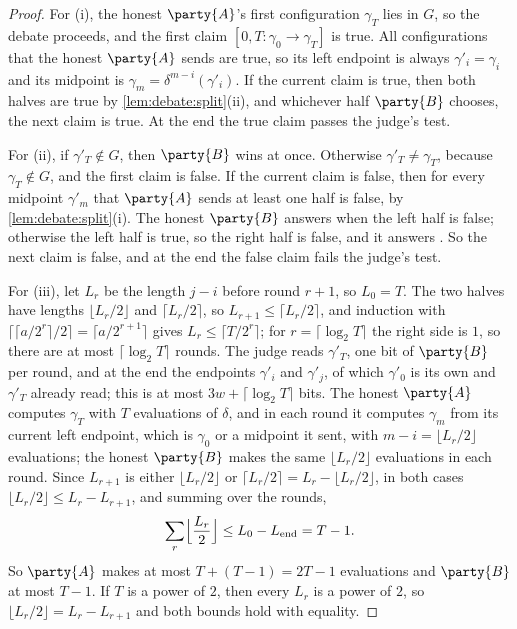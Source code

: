 \begin{refsection}
\begin{proof}
For (i), the honest $\party{A}$'s first configuration $\gamma_T$ lies in $G$, so the debate proceeds, and the first claim $[0,T:\gamma_0\to\gamma_T]$ is true. All configurations that the honest $\party{A}$ sends are true, so its left endpoint is always $\gamma'_i=\gamma_i$ and its midpoint is $\gamma_m=\delta^{m-i}(\gamma'_i)$. If the current claim is true, then both halves are true by \cref{lem:debate:split}(ii), and whichever half $\party{B}$ chooses, the next claim is true. At the end the true claim passes the judge's test.

For (ii), if $\gamma'_T\notin G$, then $\party{B}$ wins at once. Otherwise $\gamma'_T\ne\gamma_T$, because $\gamma_T\notin G$, and the first claim is false. If the current claim is false, then for every midpoint $\gamma'_m$ that $\party{A}$ sends at least one half is false, by \cref{lem:debate:split}(i). The honest $\party{B}$ answers \debateL{} when the left half is false; otherwise the left half is true, so the right half is false, and it answers \debateR. So the next claim is false, and at the end the false claim fails the judge's test.

For (iii), let $L_r$ be the length $j-i$ before round $r+1$, so $L_0=T$. The two halves have lengths $\lfloor L_r/2\rfloor$ and $\lceil L_r/2\rceil$, so $L_{r+1}\le\lceil L_r/2\rceil$, and induction with $\lceil\lceil a/2^r\rceil/2\rceil=\lceil a/2^{r+1}\rceil$ gives $L_r\le\lceil T/2^r\rceil$; for $r=\lceil\log_2T\rceil$ the right side is $1$, so there are at most $\lceil\log_2T\rceil$ rounds. The judge reads $\gamma'_T$, one bit of $\party{B}$ per round, and at the end the endpoints $\gamma'_i$ and $\gamma'_j$, of which $\gamma'_0$ is its own and $\gamma'_T$ already read; this is at most $3w+\lceil\log_2T\rceil$ bits. The honest $\party{A}$ computes $\gamma_T$ with $T$ evaluations of $\delta$, and in each round it computes $\gamma_m$ from its current left endpoint, which is $\gamma_0$ or a midpoint it sent, with $m-i=\lfloor L_r/2\rfloor$ evaluations; the honest $\party{B}$ makes the same $\lfloor L_r/2\rfloor$ evaluations in each round. Since $L_{r+1}$ is either $\lfloor L_r/2\rfloor$ or $\lceil L_r/2\rceil=L_r-\lfloor L_r/2\rfloor$, in both cases $\lfloor L_r/2\rfloor\le L_r-L_{r+1}$, and summing over the rounds,
\[\sum_r\Bigl\lfloor\frac{L_r}2\Bigr\rfloor\le L_0-L_{\mathrm{end}}=T-1.\]
So $\party{A}$ makes at most $T+(T-1)=2T-1$ evaluations and $\party{B}$ at most $T-1$. If $T$ is a power of $2$, then every $L_r$ is a power of $2$, so $\lfloor L_r/2\rfloor=L_r-L_{r+1}$ and both bounds hold with equality.
\end{proof}


\end{refsection}
